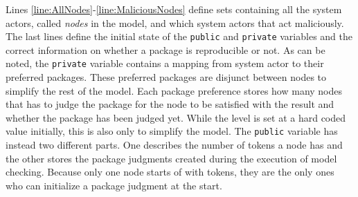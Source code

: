 Lines \ref{line:AllNodes}-\ref{line:MaliciousNodes} define sets containing all the system actors, called \textit{nodes} in the model, and which system actors that act maliciously. The last lines define the initial state of the \texttt{public} and \texttt{private} variables and the correct information on whether a package is reproducible or not. As can be noted, the \texttt{private} variable contains a mapping from system actor to their preferred packages. These preferred packages are disjunct between nodes to simplify the rest of the model. Each package preference stores how many nodes that has to judge the package for the node to be satisfied with the result and whether the package has been judged yet. While the level is set at a hard coded value initially, this is also only to simplify the model. The \texttt{public} variable has instead two different parts. One describes the number of tokens a node has and the other stores the package judgments created during the execution of model checking. Because only one node starts of with tokens, they are the only ones who can initialize a package judgment at the start.

